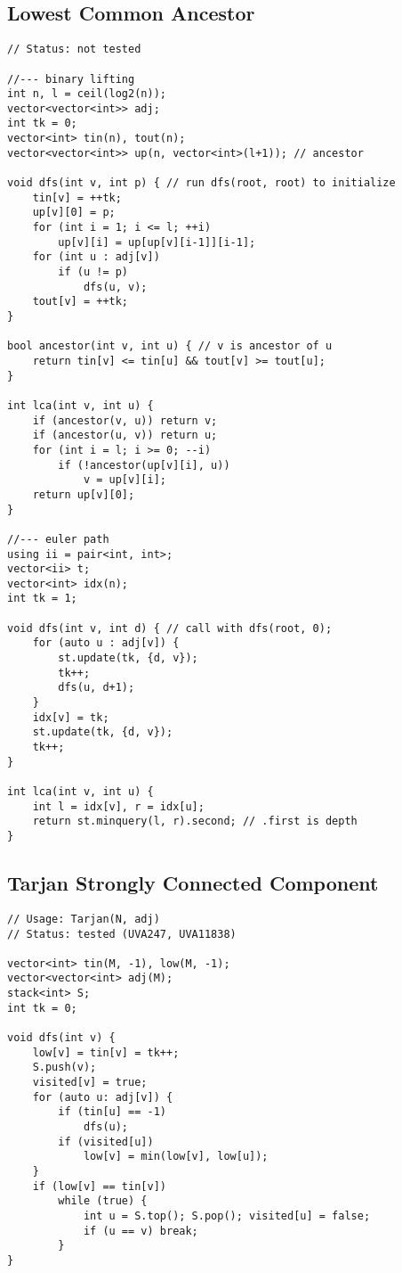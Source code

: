 \documentclass[12pt, a4paper, twoside]{article}
\begin{document}
\subsection{Lowest Common Ancestor}
\begin{lstlisting}
// Status: not tested

//--- binary lifting
int n, l = ceil(log2(n));
vector<vector<int>> adj;
int tk = 0;
vector<int> tin(n), tout(n);
vector<vector<int>> up(n, vector<int>(l+1)); // ancestor

void dfs(int v, int p) { // run dfs(root, root) to initialize
	tin[v] = ++tk;
	up[v][0] = p;
	for (int i = 1; i <= l; ++i)
		up[v][i] = up[up[v][i-1]][i-1];
	for (int u : adj[v])
		if (u != p)
			dfs(u, v);
	tout[v] = ++tk;
}

bool ancestor(int v, int u) { // v is ancestor of u
	return tin[v] <= tin[u] && tout[v] >= tout[u];
}

int lca(int v, int u) {
	if (ancestor(v, u)) return v;
	if (ancestor(u, v)) return u;
	for (int i = l; i >= 0; --i)
		if (!ancestor(up[v][i], u))
			v = up[v][i];
	return up[v][0];
}

//--- euler path
using ii = pair<int, int>;
vector<ii> t;
vector<int> idx(n);
int tk = 1;

void dfs(int v, int d) { // call with dfs(root, 0);
	for (auto u : adj[v]) {
		st.update(tk, {d, v});
		tk++;
		dfs(u, d+1);
	}
	idx[v] = tk;
	st.update(tk, {d, v});
	tk++;
}

int lca(int v, int u) {
	int l = idx[v], r = idx[u];
	return st.minquery(l, r).second; // .first is depth
}
\end{lstlisting}

\subsection{Tarjan Strongly Connected Component}
\begin{lstlisting}
// Usage: Tarjan(N, adj)
// Status: tested (UVA247, UVA11838)

vector<int> tin(M, -1), low(M, -1);
vector<vector<int> adj(M);
stack<int> S;
int tk = 0;

void dfs(int v) {
	low[v] = tin[v] = tk++;
	S.push(v);
	visited[v] = true;
	for (auto u: adj[v]) {
		if (tin[u] == -1)
			dfs(u);
		if (visited[u])
			low[v] = min(low[v], low[u]);
	}
	if (low[v] == tin[v])
		while (true) {
			int u = S.top(); S.pop(); visited[u] = false;
			if (u == v) break;
		}
}
\end{lstlisting}
\end{document}
